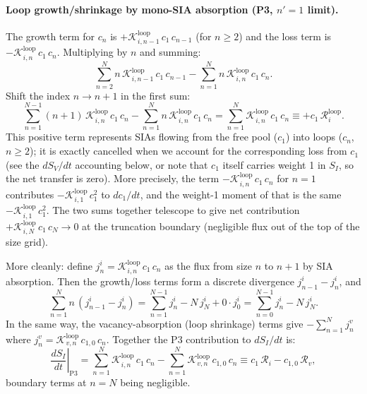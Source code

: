 \paragraph{Loop growth/shrinkage by mono-SIA absorption (P3, $n'=1$ limit).}
The growth term for $c_n$ is $+\mathcal{K}_{i,n-1}^{\mathrm{loop}}\,c_1\,c_{n-1}$
(for $n \geq 2$) and the loss term is $-\mathcal{K}_{i,n}^{\mathrm{loop}}\,c_1\,c_n$.
Multiplying by $n$ and summing:
\begin{equation}
    \sum_{n=2}^{N} n\,\mathcal{K}_{i,n-1}^{\mathrm{loop}}\,c_1\,c_{n-1}
    - \sum_{n=1}^{N} n\,\mathcal{K}_{i,n}^{\mathrm{loop}}\,c_1\,c_n.
\end{equation}
Shift the index $n \to n+1$ in the first sum:
\begin{equation}
    \sum_{n=1}^{N-1}(n+1)\,\mathcal{K}_{i,n}^{\mathrm{loop}}\,c_1\,c_n
    - \sum_{n=1}^{N} n\,\mathcal{K}_{i,n}^{\mathrm{loop}}\,c_1\,c_n
    = \sum_{n=1}^{N}\mathcal{K}_{i,n}^{\mathrm{loop}}\,c_1\,c_n
    \equiv +c_1\,\mathcal{R}_i^{\mathrm{loop}}.
\end{equation}
This positive term represents SIAs flowing from the free pool ($c_1$) into
loops ($c_n$, $n \geq 2$); it is exactly cancelled when we account for the
corresponding loss from $c_1$ (see the $dS_V/dt$ accounting below, or note
that $c_1$ itself carries weight 1 in $S_I$, so the net transfer is zero).
More precisely, the term $-\mathcal{K}_{i,n}^{\mathrm{loop}}\,c_1\,c_n$ for
$n=1$ contributes $-\mathcal{K}_{i,1}^{\mathrm{loop}}\,c_1^2$ to $dc_1/dt$,
and the weight-1 moment of that is the same $-\mathcal{K}_{i,1}^{\mathrm{loop}}\,c_1^2$.
The two sums together telescope to give net contribution
$+\mathcal{K}_{i,N}^{\mathrm{loop}}\,c_1\,c_N \to 0$ at the truncation
boundary (negligible flux out of the top of the size grid).

More cleanly: define $j_n^i = \mathcal{K}_{i,n}^{\mathrm{loop}}\,c_1\,c_n$
as the flux from size $n$ to $n+1$ by SIA absorption. Then the growth/loss
terms form a discrete divergence $j_{n-1}^i - j_n^i$, and
\begin{equation}\label{eq:telescope_i}
    \sum_{n=1}^{N} n\,(j_{n-1}^i - j_n^i)
    = \sum_{n=1}^{N-1} j_n^i - N\,j_N^i + 0 \cdot j_0^i
    = \sum_{n=0}^{N-1} j_n^i - N\,j_N^i.
\end{equation}
In the same way, the vacancy-absorption (loop shrinkage) terms give
$-\sum_{n=1}^N j_{n}^v$ where $j_n^v = \mathcal{K}_{v,n}^{\mathrm{loop}}\,c_{1,0}\,c_n$.
Together the P3 contribution to $dS_I/dt$ is:
\begin{equation}\label{eq:P3_SI}
    \left.\frac{dS_I}{dt}\right|_{\mathrm{P3}}
    = \sum_{n=1}^{N}\mathcal{K}_{i,n}^{\mathrm{loop}}\,c_1\,c_n
    - \sum_{n=1}^{N}\mathcal{K}_{v,n}^{\mathrm{loop}}\,c_{1,0}\,c_n
    \equiv c_1\,\mathcal{R}_i - c_{1,0}\,\mathcal{R}_v,
\end{equation}
boundary terms at $n=N$ being negligible.

